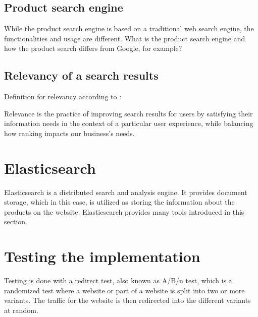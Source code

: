 \subsection{Product search engine}
While the product search engine is based on a traditional web search engine, the functionalities and usage are different. 
What is the product search engine and how the product search differs from Google, for example?



\subsection{Relevancy of a search results}
\label{sec:relevancy}
Definition for relevancy according to \citeauthor{relevantSearch}: \cite{relevantSearch}

\begin{displayquote}
Relevance is the practice of improving search results for users by satisfying their information needs in the context of a particular user experience, 
while balancing how ranking impacts our business’s needs.
\end{displayquote}




\section{Elasticsearch}
Elasticsearch is a distributed search and analysis engine. 
It provides document storage, which in this case, is utilized as storing the information about the products on the website. 
Elasticsearch provides many tools introduced in this section. \cite{elasticIntro}




\section{Testing the implementation}
Testing is done with a redirect test, also known as A/B/n test, which is a randomized test where a website or part of a website is split into two or more variants. 
The traffic for the website is then redirected into the different variants at random. \cite{optimizeAbout}




